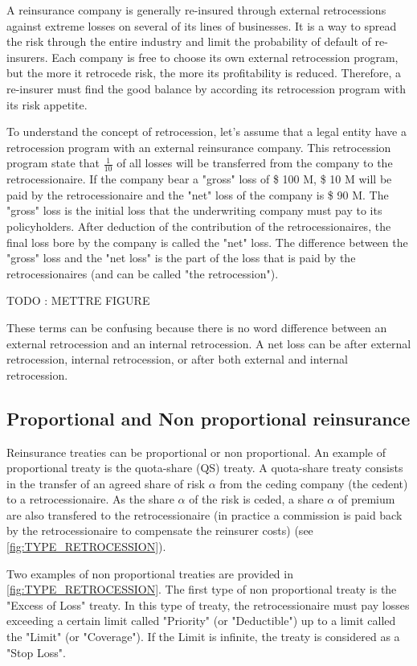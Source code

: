 A reinsurance company is generally re-insured through external retrocessions against extreme losses on several of its lines of businesses. It is a way to spread the risk through the entire industry and limit the probability of default of re-insurers. Each company is free to choose its own external retrocession program, but the more it retrocede risk, the more its profitability is reduced. Therefore, a re-insurer must find the good balance by according its retrocession program with its risk appetite.

To understand the concept of retrocession, let's assume that a legal entity have a retrocession program with an external reinsurance company. This retrocession program state that $\frac{1}{10}$ of all losses will be transferred from the company to the retrocessionaire. If the company bear a "gross" loss of \$ 100 M, \$ 10 M will be paid by the retrocessionaire and the "net" loss of the company is \$ 90 M. The "gross" loss is the initial loss that the underwriting company must pay to its policyholders. After deduction of the contribution of the retrocessionaires, the final loss bore by the company is called the "net" loss. The difference between the "gross" loss and the "net loss" is the part of the loss that is paid by the retrocessionaires (and can be called "the retrocession").

TODO : METTRE FIGURE

These terms can be confusing because there is no word difference between an external retrocession and an internal retrocession. A net loss can be after external retrocession, internal retrocession, or after both external and internal retrocession.


\subsection{Proportional and Non proportional reinsurance}

Reinsurance treaties can be proportional or non proportional. An example of proportional treaty is the quota-share (QS) treaty. A quota-share treaty consists in the transfer of an agreed share of risk $\alpha$ from the ceding company (the cedent) to a retrocessionaire. As the share $\alpha$ of the risk is ceded, a share $\alpha$ of premium are also transfered to the retrocessionaire (in practice a commission is paid back by the retrocessionaire to compensate the reinsurer costs) (see \ref{fig:TYPE_RETROCESSION}). 

Two examples of non proportional treaties are provided in \ref{fig:TYPE_RETROCESSION}. The first type of non proportional treaty is the "Excess of Loss" treaty. In this type of treaty, the retrocessionaire must pay losses exceeding a certain limit called "Priority" (or "Deductible") up to a limit called the "Limit" (or "Coverage"). If the Limit is infinite, the treaty is considered as a "Stop Loss".

